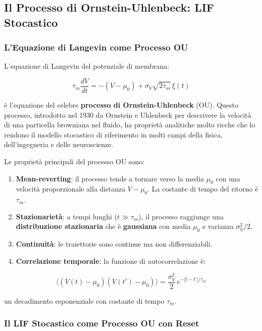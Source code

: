 \subsection{Il Processo di Ornstein-Uhlenbeck: LIF Stocastico}

\subsubsection{L'Equazione di Langevin come Processo OU}

L'equazione di Langevin del potenziale di membrana:

\begin{equation}
\tau_m \frac{dV}{dt} = -(V - \mu_0) + \sigma_V \sqrt{2\tau_m}\, \xi(t)
\end{equation}

è l'equazione del celebre \textbf{processo di Ornstein-Uhlenbeck} (OU). Questo processo, introdotto nel 1930 da Ornstein e Uhlenbeck per descrivere la velocità di una particella browniana nel fluido, ha proprietà analitiche molto ricche che lo rendono il modello stocastico di riferimento in molti campi della fisica, dell'ingegneria e delle neuroscienze.

Le proprietà principali del processo OU sono:

\begin{enumerate}
    \item \textbf{Mean-reverting}: il processo tende a tornare verso la media $\mu_0$ con una velocità proporzionale alla distanza $V - \mu_0$. La costante di tempo del ritorno è $\tau_m$.
    \item \textbf{Stazionarietà}: a tempi lunghi ($t \gg \tau_m$), il processo raggiunge una \textbf{distribuzione stazionaria} che è \textbf{gaussiana} con media $\mu_0$ e varianza $\sigma_V^2/2$.
    \item \textbf{Continuità}: le traiettorie sono continue ma non differenziabili.
    \item \textbf{Correlazione temporale}: la funzione di autocorrelazione è:
\end{enumerate}

\begin{equation}
\langle (V(t) - \mu_0)(V(t') - \mu_0) \rangle = \frac{\sigma_V^2}{2}\, e^{-|t-t'|/\tau_m}
\end{equation}

un decadimento esponenziale con costante di tempo $\tau_m$.

\subsubsection{Il LIF Stocastico come Processo OU con Reset}

